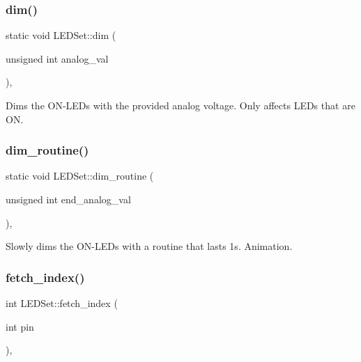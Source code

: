 \subsubsection{\texorpdfstring{dim()}{dim()}}
{\footnotesize\ttfamily static void L\+E\+D\+Set\+::dim (\begin{DoxyParamCaption}\item[{unsigned int}]{analog\+\_\+val }\end{DoxyParamCaption})\hspace{0.3cm}{\ttfamily [inline]}, {\ttfamily [static]}}



Dims the O\+N-\/\+L\+E\+Ds with the provided analog voltage. Only affects L\+E\+Ds that are ON. 

\mbox{\label{classLEDSet_a8c3c9d0c3fb93e9722cb892d0ebf2f2f}} 
\subsubsection{\texorpdfstring{dim\+\_\+routine()}{dim\_routine()}}
{\footnotesize\ttfamily static void L\+E\+D\+Set\+::dim\+\_\+routine (\begin{DoxyParamCaption}\item[{unsigned int}]{end\+\_\+analog\+\_\+val }\end{DoxyParamCaption})\hspace{0.3cm}{\ttfamily [inline]}, {\ttfamily [static]}}



Slowly dims the O\+N-\/\+L\+E\+Ds with a routine that lasts 1s.  Animation. 

\mbox{\label{classLEDSet_a2ab948b2ac81a4b4e0ace4b51579ad86}} 
\subsubsection{\texorpdfstring{fetch\+\_\+index()}{fetch\_index()}}
{\footnotesize\ttfamily int L\+E\+D\+Set\+::fetch\+\_\+index (\begin{DoxyParamCaption}\item[{int}]{pin }\end{DoxyParamCaption})\hspace{0.3cm}{\ttfamily [inline]}, {\ttfamily [private]}}



